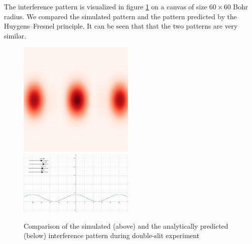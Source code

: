 The interference pattern is visualized in figure \ref{fig:double_slit_interference} on a canvas of size $60 \times 60$ Bohr radius.
We compared the simulated pattern and the pattern predicted by the Huygens–Fresnel principle.
It can be seen that that the two patterns are very similar.
\begin{figure}
	\begin{center}
		\includegraphics[width=0.5\textwidth]{figures/double_slit_interference.png}
		\includegraphics[width=0.5\textwidth]{figures/validation_of_double_slit.png}
		\caption{Comparison of the simulated (above) and the analytically predicted (below) interference pattern during double-slit experiment}
		\label{fig:double_slit_interference}
	\end{center}
\end{figure}


